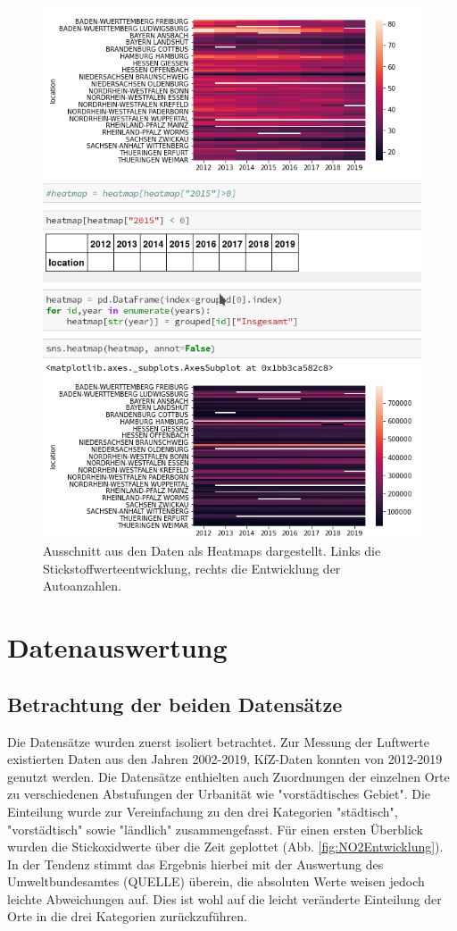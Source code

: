 \documentclass[11pt,a4paper,oneside,german]{article}
\begin{document}
	\begin{figure}[h!]
		\centering
		\includegraphics[width=12cm]{Heatmaps.png}
		\caption{Ausschnitt aus den Daten als Heatmaps dargestellt. Links die Stickstoffwerteentwicklung, rechts die Entwicklung der Autoanzahlen.}
		\label{fig:Heatmaps}
	\end{figure}
	
	\section{Datenauswertung}
	
	\subsection{Betrachtung der beiden Datensätze}
	
	Die Datensätze wurden zuerst isoliert betrachtet. Zur Messung der Luftwerte existierten Daten aus den Jahren 2002-2019, KfZ-Daten konnten von 2012-2019 genutzt werden. Die  Datensätze enthielten auch Zuordnungen der einzelnen Orte zu verschiedenen Abstufungen der Urbanität wie "vorstädtisches Gebiet". Die Einteilung wurde zur Vereinfachung zu den drei Kategorien "städtisch", "vorstädtisch" sowie "ländlich" zusammengefasst. Für einen ersten Überblick wurden die Stickoxidwerte über die Zeit geplottet (Abb. \ref{fig:NO2Entwicklung}). In der Tendenz stimmt das Ergebnis hierbei mit der Auswertung des Umweltbundesamtes (QUELLE) überein, die absoluten Werte weisen jedoch leichte Abweichungen auf. Dies ist wohl auf die leicht veränderte Einteilung der Orte in die drei Kategorien zurückzuführen.\\
	
\end{document}
